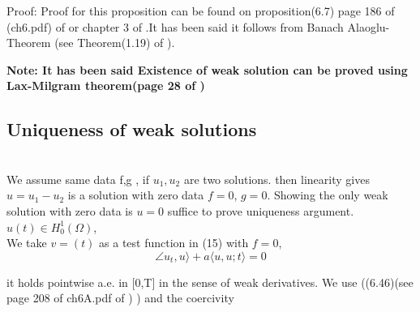 Proof: Proof for this proposition can be found on proposition(6.7) page 186 of (ch6.pdf) of \cite{lecture2} or chapter 3 of \cite{ahmed}.It has been said it follows from Banach Alaoglu-Theorem (see Theorem(1.19) of \cite{ahmed}).







\textbf{Note: It has been said Existence of weak solution can be proved using Lax-Milgram theorem(page 28 of \cite{lmu} )}


















































\subsection{Uniqueness of weak solutions}\\
We assume same data f,g , if $u_{1}, u_{2}$ are two solutions. then linearity gives $u=u_{1}-u_{2}$ is a solution with zero data $f=0$, $g=0$. Showing the only weak solution with zero data is $u=0$ suffice to prove uniqueness argument.\\
$u(t)\in H_{0}^{1}(\Omega)$, \\
We  take $v=(t)$ as a test function in (15) with $f=0$,\\
\[
\angle u_{t},u \rangle + a\langle u,u;t \rangle =0
\]

it holds pointwise a.e. in [0,T] in the sense of weak derivatives. We use ((6.46)(see page 208 of ch6A.pdf of \cite{lecture2}) ) and the coercivity






